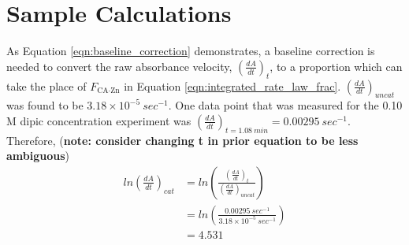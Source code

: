 \section{Sample Calculations}
As Equation \eqref{eqn:baseline_correction} demonstrates, a baseline correction is needed to convert the raw absorbance velocity, $\left(\frac{dA}{dt}\right)_{t}$, to a proportion which can take the place of $F_\text{CA$\cdot$Zn}$ in Equation \eqref{eqn:integrated_rate_law_frac}. $\left(\frac{dA}{dt}\right)_{uncat}$ was found to be $3.18\times10^{-5}\ sec^{-1}$. One data point that was measured for the 0.10 M dipic concentration experiment was $\left(\frac{dA}{dt}\right)_{t=1.08\ min}=0.00295\ sec^{-1}$. Therefore, (\textbf{note: consider changing t in prior equation to be less ambiguous}) 
\begin{equation*}
\begin{split}
ln \left(\frac{dA}{dt}\right)_{cat} 
&= ln \left( \frac{ \left (\frac{dA}{dt}\right)_{t} }{ \left (\frac{dA}{dt}\right)_{uncat} } \right) \\
&= ln \left( \frac{ 0.00295\ sec^{-1} }{ 3.18\times10^{-5}\ sec^{-1} } \right) \\
&= 4.531
\end{split}
\end{equation*} 